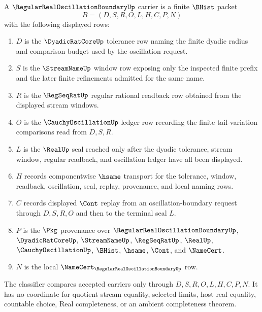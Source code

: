 \begin{definition}
\label{def:regular-real-oscillation-boundary-carrier}
A $\RegularRealOscillationBoundaryUp$ carrier is a finite $\BHist$ packet
$$
B=(D,S,R,O,L,H,C,P,N)
$$
with the following displayed rows:
\begin{enumerate}
\item $D$ is the $\DyadicRatCoreUp$ tolerance row naming the finite dyadic radius and comparison budget used by the oscillation request.
\item $S$ is the $\StreamNameUp$ window row exposing only the inspected finite prefix and the later finite refinements admitted for the same name.
\item $R$ is the $\RegSeqRatUp$ regular rational readback row obtained from the displayed stream windows.
\item $O$ is the $\CauchyOscillationUp$ ledger row recording the finite tail-variation comparisons read from $D,S,R$.
\item $L$ is the $\RealUp$ seal reached only after the dyadic tolerance, stream window, regular readback, and oscillation ledger have all been displayed.
\item $H$ records componentwise $\hsame$ transport for the tolerance, window, readback, oscillation, seal, replay, provenance, and local naming rows.
\item $C$ records displayed $\Cont$ replay from an oscillation-boundary request through $D,S,R,O$ and then to the terminal seal $L$.
\item $P$ is the $\Pkg$ provenance over $\RegularRealOscillationBoundaryUp$, $\DyadicRatCoreUp$, $\StreamNameUp$, $\RegSeqRatUp$, $\RealUp$, $\CauchyOscillationUp$, $\BHist$, $\hsame$, $\Cont$, and $\NameCert$.
\item $N$ is the local $\NameCert_{\RegularRealOscillationBoundaryUp}$ row.
\end{enumerate}
The classifier compares accepted carriers only through $D,S,R,O,L,H,C,P,N$. It has no coordinate for quotient stream equality, selected limits, host real equality, countable choice, Real completeness, or an ambient completeness theorem.
\end{definition}

